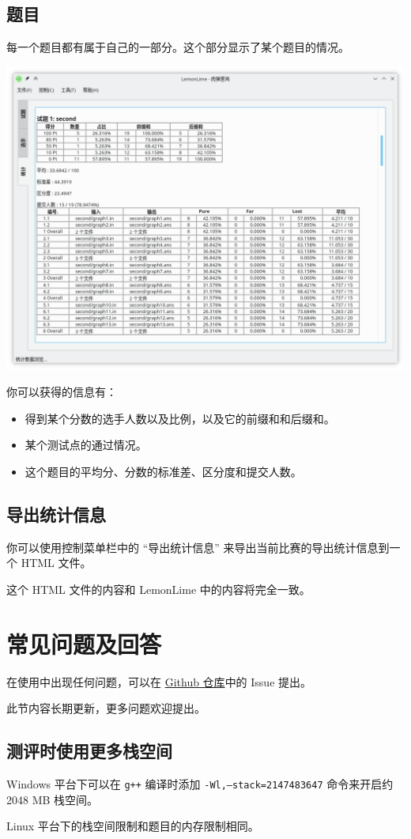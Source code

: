\documentclass[UTF-8]{ctexart}
\begin{document}
		
		\subsection{题目}
		
			每一个题目都有属于自己的一部分。这个部分显示了某个题目的情况。
			
			\begin{center}
			\includegraphics[scale=0.5]{pics/statistics2.png}
			\end{center}
		
			你可以获得的信息有：
		
			\begin{itemize}
				\item 得到某个分数的选手人数以及比例，以及它的前缀和和后缀和。
				\item 某个测试点的通过情况。
				\item 这个题目的平均分、分数的标准差、区分度和提交人数。
			\end{itemize}
		
		\subsection{导出统计信息}
	
			你可以使用控制菜单栏中的 “导出统计信息” 来导出当前比赛的导出统计信息到一个 HTML 文件。
			
			这个 HTML 文件的内容和 LemonLime 中的内容将完全一致。
	
	\newpage

	\section{常见问题及回答}
	
		在使用中出现任何问题，可以在 \href{https://github.com/Project-LemonLime/Project_LemonLime}{Github 仓库}中的 Issue 提出。
		
		此节内容长期更新，更多问题欢迎提出。
		
		\subsection{测评时使用更多栈空间}
		
			Windows 平台下可以在 \texttt{g++} 编译时添加 \texttt{-Wl,--stack=2147483647} 命令来开启约 2048 MB 栈空间。
			
			Linux 平台下的栈空间限制和题目的内存限制相同。
			
	\newpage
			
\end{document}
